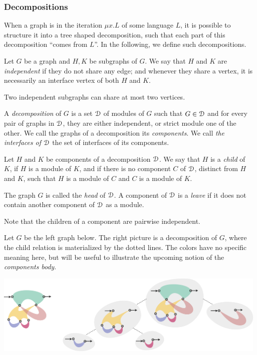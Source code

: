 \subsubsection{Decompositions}

When a graph is in the iteration $\mu x. L$ of some language $L$, it is possible to structure it into a tree shaped decomposition, such that each part of this decomposition ``comes from $L$''. In the following, we define such decompositions.  


\begin{definition} 
Let $G$ be a graph and $H, K$ be subgraphs of $G$.  We say that $H$ and $K$ are \emph{independent} if they do not share any edge; and whenever they share a vertex, it is necessarily an interface vertex of both $H$ and $K$. 
\end{definition}
\begin{remark}
Two independent subgraphs can share at most two vertices.
\end{remark}
\begin{definition}[Decompositions]
A \emph{decomposition} of $G$ is a set $\mathcal D$  of modules of $G$ such that  $G\in \mathcal D$ and for every pair of  graphs in $\mathcal D$, they are either independent, or strict module one of the other. We call  the graphs of  a decomposition its \emph{components}. We call \emph{the interfaces of $\mathcal D$} the set of interfaces of its components. 
\smallskip

Let $H$ and $K$ be components of a decomposition $\mathcal D$. We say that $H$ is a \emph{child} of $K$, if $H$ is a module of $K$, and if there is no component $C$ of $\mathcal D$, distinct from $H$ and $K$,  such that $H$ is a module of $C$ and $C$ is a module of $K$. 
\smallskip

The graph $G$ is called the \emph{head} of $\mathcal D$. A component of $\mathcal D$ is a \emph{leave} if it does not contain another component of $\mathcal D$ as a module.
 \end{definition}
 \begin{remark} Note that  the children of a component are pairwise independent.
\end{remark}


 \begin{example}\label{example:decomposition} Let $G$ be the left graph below. The right picture is a decomposition of $G$, where the child relation  is materialized by the dotted lines. The colors have no specific meaning here, but will be useful to illustrate the upcoming notion of the \emph{components body}.  
 \begin{center}
\includegraphics[scale=.10]{Pictures/decomposition}
\end{center}
 \end{example}
 
